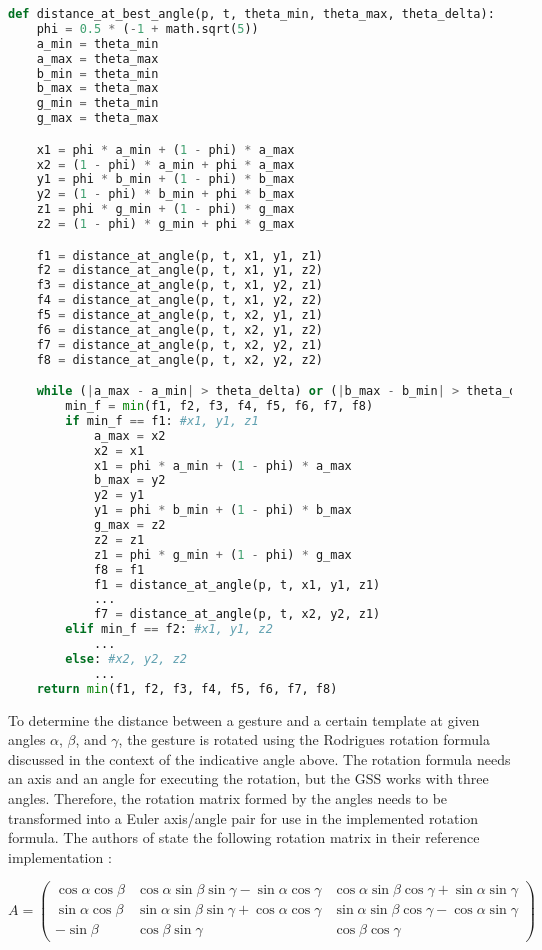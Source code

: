 \begin{lstlisting}[label=lst:daba,language=python,frame=lt,caption=Three-dimensional Golden Section Search for finding the best angle between a candidate gesture and a template]
def distance_at_best_angle(p, t, theta_min, theta_max, theta_delta):
	phi = 0.5 * (-1 + math.sqrt(5))
	a_min = theta_min
	a_max = theta_max
	b_min = theta_min
	b_max = theta_max
	g_min = theta_min
	g_max = theta_max

	x1 = phi * a_min + (1 - phi) * a_max
	x2 = (1 - phi) * a_min + phi * a_max
	y1 = phi * b_min + (1 - phi) * b_max
	y2 = (1 - phi) * b_min + phi * b_max
	z1 = phi * g_min + (1 - phi) * g_max
	z2 = (1 - phi) * g_min + phi * g_max	

	f1 = distance_at_angle(p, t, x1, y1, z1)
	f2 = distance_at_angle(p, t, x1, y1, z2)
	f3 = distance_at_angle(p, t, x1, y2, z1)
	f4 = distance_at_angle(p, t, x1, y2, z2)
	f5 = distance_at_angle(p, t, x2, y1, z1)
	f6 = distance_at_angle(p, t, x2, y1, z2)
	f7 = distance_at_angle(p, t, x2, y2, z1)
	f8 = distance_at_angle(p, t, x2, y2, z2)

	while (|a_max - a_min| > theta_delta) or (|b_max - b_min| > theta_delta) or (|g_max - g_min| > theta_delta):	
		min_f = min(f1, f2, f3, f4, f5, f6, f7, f8)
		if min_f == f1: #x1, y1, z1
			a_max = x2
			x2 = x1
			x1 = phi * a_min + (1 - phi) * a_max
			b_max = y2
			y2 = y1
			y1 = phi * b_min + (1 - phi) * b_max
			g_max = z2
			z2 = z1
			z1 = phi * g_min + (1 - phi) * g_max
			f8 = f1
			f1 = distance_at_angle(p, t, x1, y1, z1)
			...
			f7 = distance_at_angle(p, t, x2, y2, z1)
		elif min_f == f2: #x1, y1, z2
			...
		else: #x2, y2, z2
			...
	return min(f1, f2, f3, f4, f5, f6, f7, f8)
\end{lstlisting}

To determine the distance between a gesture and a certain template at given angles $ \alpha $, $ \beta $, and $ \gamma $, the gesture is rotated using the Rodrigues rotation formula discussed in the context of the indicative angle above. The rotation formula needs an axis and an angle for executing the rotation, but the \ac{GSS} works with three angles. Therefore, the rotation matrix formed by the angles needs to be transformed into a Euler axis/angle pair for use in the implemented rotation formula. The authors of \cite{Kratz2010} state the following rotation matrix in their reference implementation \cite{repo:3dollar}:

\[
A = 
\begin{pmatrix}
\cos{\alpha}\cos{\beta} & \cos{\alpha}\sin{\beta}\sin{\gamma} - \sin{\alpha}\cos{\gamma} & \cos{\alpha}\sin{\beta}\cos{\gamma} + \sin{\alpha}\sin{\gamma} \\
\sin{\alpha}\cos{\beta} & \sin{\alpha}\sin{\beta}\sin{\gamma} + \cos{\alpha}\cos{\gamma} & \sin{\alpha}\sin{\beta}\cos{\gamma} - \cos{\alpha}\sin{\gamma} \\
-\sin{\beta} & \cos{\beta}\sin{\gamma} & \cos{\beta}\cos{\gamma}
\end{pmatrix}
\]

